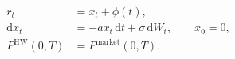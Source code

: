 \documentclass{equation-sheet}
\begin{document}
\begin{equation*}
\begin{aligned}
r_t &= x_t + \phi(t), \\[0.55em]
\mathrm{d}x_t
  &= -a x_t\,\mathrm{d}t + \sigma\,\mathrm{d}W_t,
  \qquad x_0=0, \\[0.55em]
P^{\mathrm{HW}}(0,T)
  &= P^{\mathrm{market}}(0,T).
\end{aligned}
\end{equation*}
\end{document}
